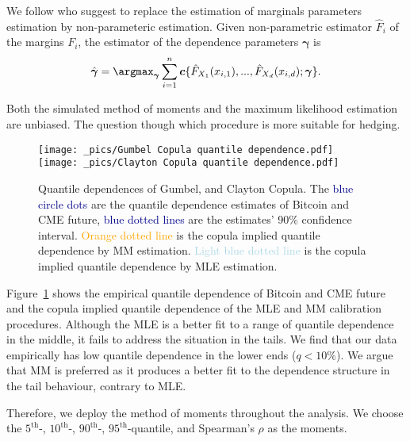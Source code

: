 We follow \citet{genest1995semiparametric} who suggest to replace the estimation of marginals parameters estimation by non-parameteric estimation.
Given non-parametric estimator $\hat{F}_i$ of the margins $F_i$, the estimator of the dependence parameters $\bm{\gamma}$ is
\begin{equation*}
    \hat{\bm{\gamma}} = \argmax_{\bm{\gamma}} \sum_{i=1}^n \bm{c}\{ \hat{F}_{X_1}(x_{i,1}), ..., \hat{F}_{X_d}(x_{i,d});\bm{\gamma}\}.
    \end{equation*}

Both the simulated method of moments and the maximum likelihood estimation are unbiased.
The question though which procedure is more suitable for hedging.

\begin{figure}[h]
\texttt{[image: \_pics/Gumbel Copula quantile dependence.pdf]}
\texttt{[image: \_pics/Clayton Copula quantile dependence.pdf]}
  \caption{Quantile dependences of Gumbel, and Clayton Copula. The \textcolor{darkblue}{blue circle dots} are
  the quantile dependence estimates of Bitcoin and CME future, \textcolor{darkblue}{blue dotted lines} are the estimates' 90\% confidence interval.
  \textcolor{orange}{Orange dotted line} is the copula implied quantile dependence by MM estimation.
  \textcolor{lightblue}{Light blue dotted line} is the copula implied quantile dependence by MLE estimation.
  }
\label{fig:quantile dependence1}
\end{figure}

Figure~\ref{fig:quantile dependence1} shows the empirical quantile dependence of Bitcoin and CME future and the copula implied
quantile dependence of the MLE and MM calibration procedures.
Although the MLE is a better fit to a range of quantile dependence in the middle, it fails to address the situation in the tails.
We find that our data empirically has low quantile dependence in the lower ends ($q<10\%$).
We argue that MM is preferred as it produces a better fit to the dependence
structure in the tail behaviour, contrary to MLE. \medskip

Therefore, we deploy the method of moments throughout the
analysis.
We choose the $5^\text{th}$-, $10^\text{th}$-, $90^\text{th}$-, $95^\text{th}$-quantile, and Spearman's $\rho$ as the moments.


